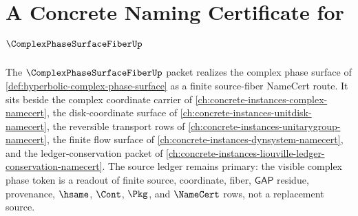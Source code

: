 \chapter{A Concrete Naming Certificate for $\ComplexPhaseSurfaceFiberUp$}
\label{ch:concrete-instances-complex-phase-surface-fiber-namecert}

The $\ComplexPhaseSurfaceFiberUp$ packet realizes the complex phase surface of \autoref{def:hyperbolic-complex-phase-surface} as a finite source-fiber NameCert route. It sits beside the complex coordinate carrier of \autoref{ch:concrete-instances-complex-namecert}, the disk-coordinate surface of \autoref{ch:concrete-instances-unitdisk-namecert}, the reversible transport rows of \autoref{ch:concrete-instances-unitarygroup-namecert}, the finite flow surface of \autoref{ch:concrete-instances-dynsystem-namecert}, and the ledger-conservation packet of \autoref{ch:concrete-instances-liouville-ledger-conservation-namecert}. The source ledger remains primary: the visible complex phase token is a readout of finite source, coordinate, fiber, $\mathsf{GAP}$ residue, provenance, $\hsame$, $\Cont$, $\Pkg$, and $\NameCert$ rows, not a replacement source.

